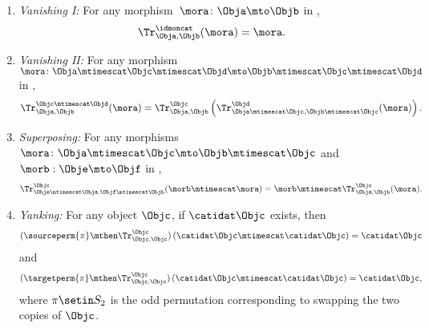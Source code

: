 \begin{widepar}
\begin{ctdefinition}
\begin{enumerate}
            \item \emph{Vanishing I:}
                  For any morphism~$\mora \colon \Obja\mto \Objb$ in \CatC,
                  \begin{equation}
                      \label{eq:semicat-trace-vanishing_1}
                      \Tr_{\Obja,\Objb}^\idmoncat (\mora)=\mora.
                  \end{equation}

            \item \emph{Vanishing II:}
                  For any morphism~$\mora \colon \Obja\mtimescat \Objc \mtimescat \Objd \mto \Objb\mtimescat \Objc \mtimescat \Objd$ in \CatC,
                  \begin{equation}
                      \label{eq:semicat-trace-vanishing_2}
                      \Tr_{\Obja,\Objb}^{\Objc\mtimescat \Objd}(\mora)=\Tr_{\Obja,\Objb}^\Objc\left(
                      \Tr_{\Obja \mtimescat \Objc, \Objb \mtimescat \Objc}^\Objd(\mora)\right).
                  \end{equation}

            \item \emph{Superposing:}
                  For any morphisms~$\mora\colon \Obja\mtimescat \Objc \mto \Objb\mtimescat \Objc$ and $\morb : \Obje \mto \Objf$ in \CatC,
                  \begin{equation}
                      \label{eq:semicat-trace-superposing}
                      \Tr_{\Obje\mtimescat \Obja,\Objf\mtimescat \Objb}^{\Objc}(\morb \mtimescat \mora)=\morb \mtimescat \Tr_{\Obja,\Objb}^\Objc(\mora).
                  \end{equation}

            \item \emph{Yanking:}
                  For any object $\Objc$, if $\catidat\Objc$ exists, then
                  \begin{equation}
                      \label{eq:semicat-trace-yanking-I}
                      (\sourceperm{\pi}   \mthen \Tr_{\Objc,\Objc}^\Objc)\left(\catidat\Objc \mtimescat \catidat\Objc \right)=\catidat\Objc
                  \end{equation}
                  and
                  \begin{equation}
                      \label{eq:semicat-trace-yanking-II}
                      (\targetperm{\pi}  \mthen \Tr_{\Objc,\Objc}^\Objc)\left(\catidat\Objc \mtimescat \catidat\Objc \right)=\catidat\Objc,
                  \end{equation}
                  where $\pi \setin S_2$ is the odd permutation corresponding to swapping the two copies of $\Objc$.
        \end{enumerate}
    \end{ctdefinition}
\end{widepar}

